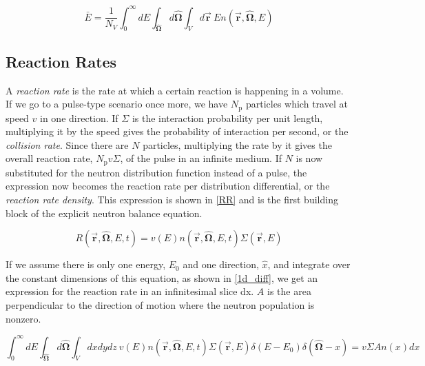 \begin{equation}
\label{NDF_avg}
\bar{E} = \frac{1}{N_V } \int_0^\infty dE \int_{\boldsymbol{\hat{\Omega}}} d\boldsymbol{\hat{\Omega}}  \int_{V} d\boldsymbol{\vec{r}} \: E n(\boldsymbol{\vec{r}},\boldsymbol{\hat{\Omega}},E) 
\end{equation}

\subsection{Reaction Rates}

A \emph{reaction rate} is the rate at which a certain reaction is happening in a volume.  If we go to a pulse-type scenario once more, we have $N_\mathrm{p}$ particles which travel at speed $v$ in one direction.  If $\Sigma$ is the interaction probability per unit length, multiplying it by the speed gives the probability of interaction per second, or the \emph{collision rate}.  Since there are $N$ particles, multiplying the rate by it gives the overall reaction rate, $N_\mathrm{p} v \Sigma$, of the pulse in an infinite medium.  If $N$ is now substituted for the neutron distribution function instead of a pulse, the expression now becomes the reaction rate per distribution differential, or the \emph{reaction rate density}.  This expression is shown in \eqref{RR} and is the first building block of the explicit neutron balance equation.

\begin{equation}
\label{RR}
R(\boldsymbol{\vec{r}},\boldsymbol{\hat{\Omega}},E,t)  = v(E) n(\boldsymbol{\vec{r}},\boldsymbol{\hat{\Omega}},E,t) \Sigma(\boldsymbol{\vec{r}},E)
\end{equation}

If we assume there is only one energy, $E_0$ and one direction, $\hat{x}$, and integrate over the constant dimensions of this equation, as shown in \eqref{1d_diff}, we get an expression for the reaction rate in an infinitesimal slice dx.  $A$ is the area perpendicular to the direction of motion where the neutron population is nonzero.


\begin{equation}
\label{1d_diff}
 \int_0^\infty dE \int_{\boldsymbol{\hat{\Omega}}} d\boldsymbol{\hat{\Omega}}  \int_{V} dx dy dz \:  v(E) n(\boldsymbol{\vec{r}},\boldsymbol{\hat{\Omega}},E,t) \Sigma(\boldsymbol{\vec{r}},E) \delta(E-E_0) \delta(\boldsymbol{\hat{\Omega}}-\hat{x})  = v \Sigma A n(x)dx 
\end{equation}

